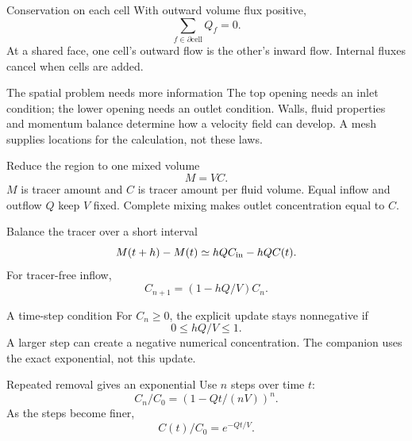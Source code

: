 \documentclass[aspectratio=169,11pt]{beamer}
\newcommand{\notestarget}{notes.pdf}\newcommand{\noteslabel}{Notes}
\begin{document}
\renewcommand{\notestarget}{notes.pdf\#note-connectivity-and-the-missing-spatial-problem}
\begin{frame}[t,fragile,label=slide-conservation-on-each-cell]{Conservation on each cell}
With outward volume flux positive,
\[\sum_{f\in\partial\mathrm{cell}}Q_f=0.\]
\pause{}
At a shared face, one cell's outward flow is the other's inward flow.
Internal fluxes cancel when cells are added.
\end{frame}
\renewcommand{\notestarget}{notes.pdf\#note-connectivity-and-the-missing-spatial-problem}
\begin{frame}[t,fragile,label=slide-the-spatial-problem-needs-more-information]{The spatial problem needs more information}
The top opening needs an inlet condition; the lower opening needs an outlet condition.
\pause{}
Walls, fluid properties and momentum balance determine how a velocity field can develop.
A mesh supplies locations for the calculation, not these laws.
\end{frame}
\renewcommand{\notestarget}{notes.pdf\#note-a-deliberately-well-mixed-reduction}
\begin{frame}[t,fragile,label=slide-reduce-the-region-to-one-mixed-volume]{Reduce the region to one mixed volume}
\[M=VC.\]
$M$ is tracer amount and $C$ is tracer amount per fluid volume.
\pause{}
Equal inflow and outflow $Q$ keep $V$ fixed.
Complete mixing makes outlet concentration equal to $C$.
\end{frame}
\renewcommand{\notestarget}{notes.pdf\#note-a-deliberately-well-mixed-reduction}
\begin{frame}[t,fragile,label=slide-balance-the-tracer-over-a-short-interval]{Balance the tracer over a short interval}
\[M(t+h)-M(t)\simeq hQ C_{\rm in}-hQC(t).\]
\pause{}
For tracer-free inflow,
\[C_{n+1}=(1-hQ/V)C_n.\]
\end{frame}
\renewcommand{\notestarget}{notes.pdf\#note-a-deliberately-well-mixed-reduction}
\begin{frame}[t,fragile,label=slide-a-time-step-condition]{A time-step condition}
For $C_n\geq0$, the explicit update stays nonnegative if
\[0\leq hQ/V\leq1.\]
\pause{}
A larger step can create a negative numerical concentration.
The companion uses the exact exponential, not this update.
\end{frame}
\renewcommand{\notestarget}{notes.pdf\#note-the-exponential-and-its-time-scale}
\begin{frame}[t,fragile,label=slide-repeated-removal-gives-an-exponential]{Repeated removal gives an exponential}
Use $n$ steps over time $t$:
\[C_n/C_0=(1-Qt/(nV))^n.\]
\pause{}
As the steps become finer,
\[\boxed{C(t)/C_0=e^{-Qt/V}}.\]
\end{frame}
\end{document}
